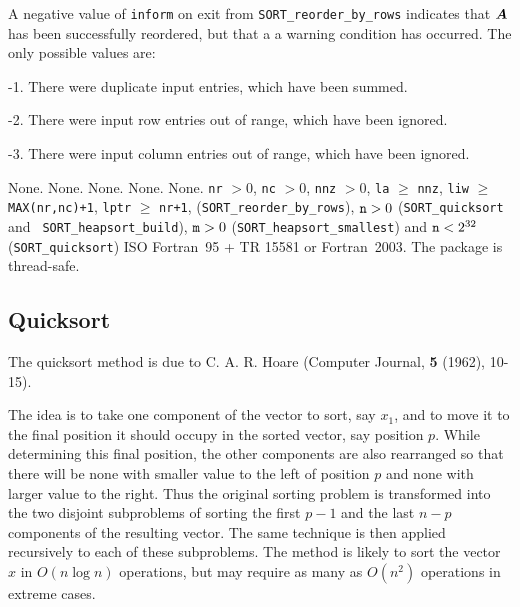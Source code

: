 \documentclass{galahad}
\newcommand{\packagename}{SORT}
\begin{document}
A negative value of {\tt inform} on exit from
{\tt \packagename\_reorder\_by\_rows} indicates
that ${\bm{A}}$ has been successfully reordered, but that a
a warning condition has occurred.
The only possible values are:

\begin{description}
\item{-1.} There were duplicate input entries, which have been summed.
\item{-2.} There were input row entries out of range, which have been ignored.
\item{-3.} There were input column entries out of range, which have been
ignored.
\end{description}


\galgeneral

\galcommon None.
\galworkspace None.
\galroutines None.
\galmodules None.
\galio None.
\galrestrictions
{\tt nr} $> 0$,
{\tt nc} $> 0$,
{\tt nnz} $> 0$,
{\tt la} $\geq$ {\tt nnz},
{\tt liw} $\geq$ {\tt MAX(nr,nc)+1},
{\tt lptr} $\geq$ {\tt nr+1},
({\tt \packagename\_reorder\_by\_rows}),
${\tt n} > 0$ ({\tt \packagename\_quicksort} and {\tt
\packagename\_heapsort\_build}),
${\tt m} > 0$ ({\tt \packagename\_heapsort\_smallest}) and
${\tt n} < 2^{32}$ \\ ({\tt \packagename\_quicksort})
\galportability ISO Fortran~95 + TR 15581 or Fortran~2003.
The package is thread-safe.


\galmethod

\subsection{Quicksort}

The quicksort method is due to C. A. R. Hoare (Computer Journal, {\bf 5 }
(1962), 10-15).

\noindent
The idea is to take one component of the vector to sort, say $x_1$, and to
move it to the final position it should occupy in the sorted vector, say
position $p$. While determining this final position, the other components are
also rearranged so that there will be none with smaller value to the left of
position $p$ and none with larger value to the right. Thus the original
sorting problem is transformed into the two disjoint subproblems of sorting the
first $p-1$ and the last $n-p$ components of the resulting vector. The same
technique is then applied recursively to each of these subproblems.
The method is likely to sort the vector $x$ in $O( n \log n )$ operations,
but may require as many as $O( n^2 )$ operations in extreme cases.
\end{document}
